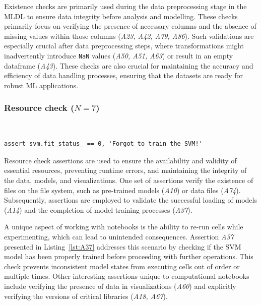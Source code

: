 Existence checks are primarily used during the data preprocessing stage in the MLDL to ensure data integrity before analysis and modelling. These checks primarily focus on verifying the presence of necessary columns and the absence of missing values within those columns (\emph{A23, A42, A79, A86}). Such validations are especially crucial after data preprocessing steps, where transformations might inadvertently introduce \lstinline{NaN} values (\emph{A50, A51, A63}) or result in an empty dataframe (\emph{A43}). These checks are also crucial for maintaining the accuracy and efficiency of data handling processes, ensuring that the datasets are ready for robust ML applications.


\subsubsection{Resource check ($N = 7$)}~\label{sec:result-rq2-resource-check}

\begin{lstlisting}[caption={Assertion \emph{A37} used to ensure that an ML model has not reached an inconsistent state due to out-of-order or re-execution of code cells.}, label={lst:A37}]
assert svm.fit_status_ == 0, 'Forgot to train the SVM!'
\end{lstlisting}

Resource check assertions are used to ensure the availability and validity of essential resources, preventing runtime errors, and maintaining the integrity of the data, models, and visualizations. One set of assertions verify the existence of files on the file system, such as pre-trained models (\emph{A10}) or data files (\emph{A74}). Subsequently, assertions are employed to validate the successful loading of models (\emph{A14}) and the completion of model training processes (\emph{A37}).

A unique aspect of working with notebooks is the ability to re-run cells while experimenting, which can lead to unintended consequences. Assertion \emph{A37} presented in Listing~\ref{lst:A37} addresses this scenario by checking if the SVM model has been properly trained before proceeding with further operations. This check prevents inconsistent model states from executing cells out of order or multiple times. Other interesting assertions unique to computational notebooks include verifying the presence of data in visualizations (\emph{A60}) and explicitly verifying the versions of critical libraries (\emph{A18, A67}).

